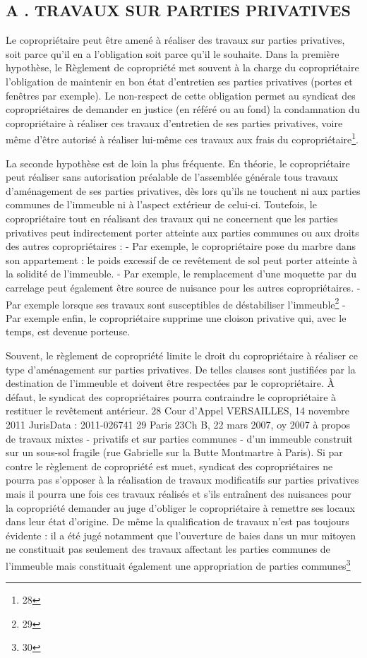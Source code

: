 	\subsection{A . TRAVAUX SUR PARTIES PRIVATIVES}
	
		Le copropriétaire peut être amené à réaliser des travaux sur parties privatives, soit parce qu’il en a l’obligation soit parce qu’il le souhaite.
		Dans la première hypothèse, le Règlement de copropriété met souvent à la charge du copropriétaire l’obligation de maintenir en bon état d’entretien ses parties privatives (portes et fenêtres par exemple). Le non-respect de cette obligation permet au syndicat des copropriétaires de demander en justice (en référé ou au fond) la condamnation du copropriétaire à réaliser ces travaux d’entretien de ses parties privatives, voire même d’être autorisé à réaliser lui-même ces travaux aux frais du copropriétaire\footnote{28}.
		
		La seconde hypothèse est de loin la plus fréquente.
		En théorie, le copropriétaire peut réaliser sans autorisation préalable de l'assemblée générale tous travaux d'aménagement de ses parties privatives, dès lors qu'ils ne touchent ni aux parties communes de l'immeuble ni à l'aspect extérieur de celui-ci.
		Toutefois, le copropriétaire tout en réalisant des travaux qui ne concernent que les parties privatives peut indirectement porter atteinte aux parties communes ou aux droits des autres copropriétaires :
		- Par exemple, le copropriétaire pose du marbre dans son appartement : le poids excessif de ce revêtement de sol peut porter atteinte à la solidité de l'immeuble.
		- Par exemple, le remplacement d'une moquette par du carrelage peut également être source de nuisance pour les autres copropriétaires.
		- Par exemple lorsque ses travaux sont susceptibles de déstabiliser l’immeuble\footnote{29}
		- Par exemple enfin, le copropriétaire supprime une cloison privative qui, avec le temps, est devenue porteuse.
		
		Souvent, le règlement de copropriété limite le droit du copropriétaire à réaliser ce type d'aménagement sur parties privatives. De telles clauses sont justifiées par la destination de l'immeuble et doivent être respectées par le copropriétaire. À défaut, le syndicat des copropriétaires pourra contraindre le copropriétaire à restituer le revêtement antérieur.
		28 Cour d'Appel VERSAILLES, 14 novembre 2011 JurisData : 2011-026741
		29 Paris 23\degres Ch B, 22 mars 2007, oy 2007  à propos de travaux mixtes - privatifs et sur parties communes - d’un immeuble construit sur un sous-sol fragile (rue Gabrielle sur la Butte Montmartre à Paris).
		Si par contre le règlement de copropriété est muet, syndicat des copropriétaires ne pourra pas s'opposer à la réalisation de travaux modificatifs sur parties privatives mais il pourra une fois ces travaux réalisés et s'ils entraînent des nuisances pour la copropriété demander au juge d'obliger le copropriétaire à remettre ses locaux dans leur état d'origine.
		De même la qualification de travaux n’est pas toujours évidente : il a été jugé notamment que l’ouverture de baies dans un mur mitoyen ne constituait pas seulement des travaux affectant les parties communes de l’immeuble mais constituait également une appropriation de parties communes\footnote{30}
	
